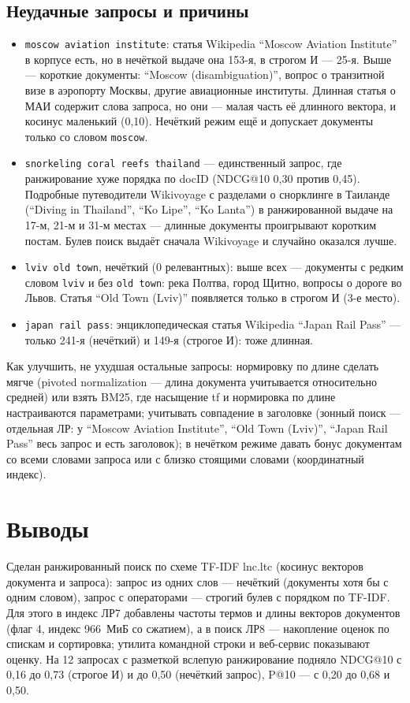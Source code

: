 \subsection{Неудачные запросы и причины}
\begin{itemize}
    \item \texttt{moscow aviation institute}: статья Wikipedia \enquote{Moscow Aviation Institute} в корпусе есть, но в нечёткой выдаче она 153-я, в строгом И --- 25-я. Выше --- короткие документы: \enquote{Moscow (disambiguation)}, вопрос о транзитной визе в аэропорту Москвы, другие авиационные институты. Длинная статья о МАИ содержит слова запроса, но они --- малая часть её длинного вектора, и косинус маленький (0,10). Нечёткий режим ещё и допускает документы только со словом \texttt{moscow}.
    \item \texttt{snorkeling coral reefs thailand} --- единственный запрос, где ранжирование хуже порядка по docID (NDCG@10 0,30 против 0,45). Подробные путеводители Wikivoyage с разделами о снорклинге в Таиланде (\enquote{Diving in Thailand}, \enquote{Ko Lipe}, \enquote{Ko Lanta}) в ранжированной выдаче на 17-м, 21-м и 31-м местах --- длинные документы проигрывают коротким постам. Булев поиск выдаёт сначала Wikivoyage и случайно оказался лучше.
    \item \texttt{lviv old town}, нечёткий (0 релевантных): выше всех --- документы с редким словом \texttt{lviv} и без \texttt{old town}: река Полтва, город Щитно, вопросы о дороге во Львов. Статья \enquote{Old Town (Lviv)} появляется только в строгом И (3-е место).
    \item \texttt{japan rail pass}: энциклопедическая статья Wikipedia \enquote{Japan Rail Pass} --- только 241-я (нечёткий) и 149-я (строгое И): тоже длинная.
\end{itemize}
Как улучшить, не ухудшая остальные запросы: нормировку по длине сделать мягче (pivoted normalization --- длина документа учитывается относительно средней) или взять BM25, где насыщение tf и нормировка по длине настраиваются параметрами; учитывать совпадение в заголовке (зонный поиск --- отдельная ЛР: у \enquote{Moscow Aviation Institute}, \enquote{Old Town (Lviv)}, \enquote{Japan Rail Pass} весь запрос и есть заголовок); в нечётком режиме давать бонус документам со всеми словами запроса или с близко стоящими словами (координатный индекс).

\section{Выводы}
Сделан ранжированный поиск по схеме TF-IDF lnc.ltc (косинус векторов документа и запроса): запрос из одних слов --- нечёткий (документы хотя бы с одним словом), запрос с операторами --- строгий булев с порядком по TF-IDF. Для этого в индекс ЛР7 добавлены частоты термов и длины векторов документов (флаг 4, индекс 966~МиБ со сжатием), а в поиск ЛР8 --- накопление оценок по спискам и сортировка; утилита командной строки и веб-сервис показывают оценку. На 12 запросах с разметкой вслепую ранжирование подняло NDCG@10 с 0,16 до 0,73 (строгое И) и до 0,50 (нечёткий запрос), P@10 --- с 0,20 до 0,68 и 0,50.

